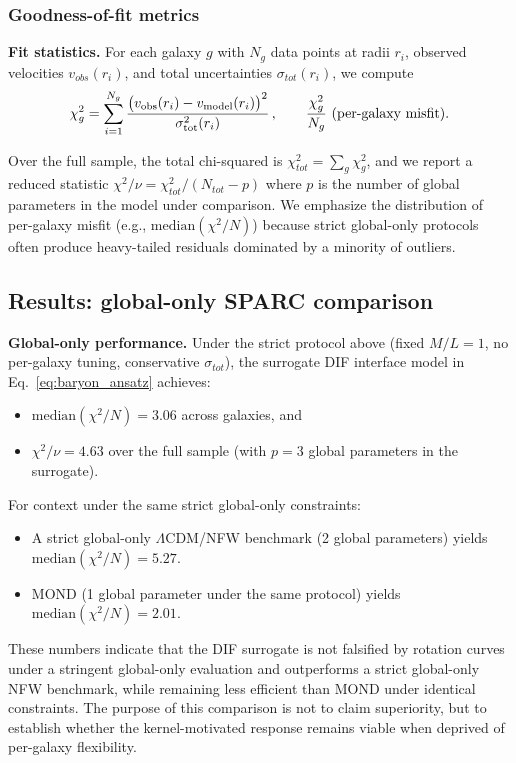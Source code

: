 \documentclass[entropy,article,submit,pdftex,moreauthors]{Definitions/mdpi}
\begin{document}
\subsubsection{Goodness-of-fit metrics}

\textbf{Fit statistics.} For each galaxy $g$ with $N_g$ data points at radii $r_i$, observed velocities $v_{obs}(r_i)$, and total uncertainties $\sigma_{tot}(r_i)$, we compute
\begin{equation}
    \\\chi_g^2
= \sum_{i=1}^{N_g}\frac{\big(v_{\mathrm{obs}}(r_i)-v_{\mathrm{model}}(r_i)\big)^2}{\sigma^2_{\mathrm{tot}}(r_i)}
\,,
\qquad
\frac{\chi_g^2}{N_g}\ \text{(per-galaxy misfit)}.
\end{equation}

Over the full sample, the total chi-squared is $\chi^2_{tot} = \sum_g \chi^2_g$, and we report a reduced statistic $\chi^2/\nu =\chi^2_{tot}/(N_{tot}-p)$ where $p$ is the number of global parameters in the model under comparison. We emphasize the distribution of per-galaxy misfit (e.g., $\text{median}(\chi^2/N)$) because strict global-only protocols often produce heavy-tailed residuals dominated by a minority of outliers.

\subsection{Results: global-only SPARC comparison}

\textbf{Global-only performance.} Under the strict protocol above (fixed $M/L = 1$, no per-galaxy tuning, conservative $\sigma_{tot}$), the surrogate DIF interface model in Eq.~\ref{eq:baryon_ansatz} achieves:
\begin{itemize}[itemsep=2pt]
    \item $\text{median}(\chi^2/N) = 3.06$ across galaxies, and
    \item $\chi^2/\nu = 4.63$ over the full sample (with $p=3$ global parameters in the surrogate).
\end{itemize}
For context under the same strict global-only constraints:
\begin{itemize}[itemsep=2pt]
    \item A strict global-only $\Lambda$CDM/NFW benchmark (2 global parameters) yields \\ $\text{median}(\chi^2/N) = 5.27$.
    \item MOND (1 global parameter under the same protocol) yields $\text{median}(\chi^2/N) = 2.01$.
\end{itemize}
These numbers indicate that the DIF surrogate is not falsified by rotation curves under a stringent global-only evaluation and outperforms a strict global-only NFW benchmark, while remaining less efficient than MOND under identical constraints. The purpose of this comparison is not to claim superiority, but to establish whether the kernel-motivated response remains viable when deprived of per-galaxy flexibility.
\end{document}
